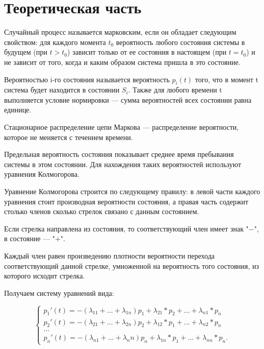 \documentclass[a4paper, 14pt, unknownkeysallowed]{extreport}
\begin{document}

\setcounter{page}{2}

\chapter{Теоретическая часть}
Случайный процесс называется марковским, если он обладает следующим свойством: для каждого момента $t_0$ вероятность любого состояния системы в будущем (при $t > t_0$) зависит только от ее состояния в настоящем (при $t = t_0$) и не зависит от того, когда и каким образом система пришла в это состояние.  

Вероятностью i-го состояния называется вероятность $p_i(t)$ того, что в момент t система будет находится в состоянии $S_i$. Также для любого времени t выполняется условие нормировки --- сумма вероятностей всех состоянии равна единице.

Стационарное распределение цепи Маркова --- распределение вероятности, которое не меняется с течением времени.

Предельная вероятность состояния показывает среднее время пребывания системы в этом состоянии. Для нахождения таких вероятностей используют уравнения Колмогорова.

Уравнение Колмогорова строится по следующему правилу: в левой части каждого уравнения стоит производная вероятности состояния, а правая часть содержит столько членов сколько стрелок связано с данным состоянием.

Если стрелка направлена из состояния, то соответствующий член имеет знак "$-$", в состояние --- "$+$". 

Каждый член равен произведению плотности вероятности перехода соответствующий данной стрелке, умноженной на вероятность того состояния, из которого исходит стрелка. 

\newpage
Получаем систему уравнений вида:

\begin{equation}
	\label{ass}
	\begin{cases}
		p_1'(t) =  -(\lambda_{11} + ... + \lambda_{1n})p_1 + \lambda_{21}*p_2+...+\lambda_{n1}*p_n\\
		p_2'(t) =  -(\lambda_{21} + ... + \lambda_{2n})p_2 + \lambda_{12}*p_1+...+\lambda_{n2}*p_n\\
		...\\
		p_n'(t) =  -(\lambda_{n1}+ ... + \lambda_nn)p_n + \lambda_{1n}*p_1+...+\lambda_{nn}*p_{n}.
	\end{cases}
\end{equation} 
\end{document}
